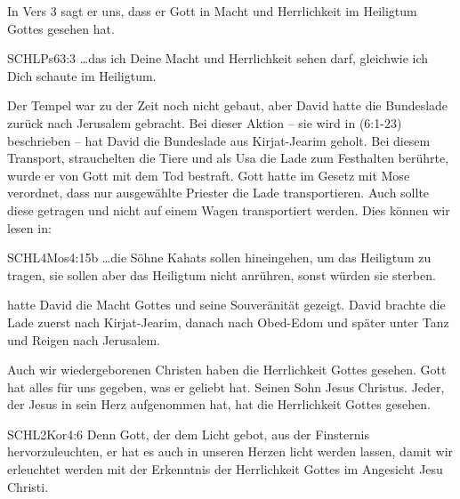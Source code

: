 \documentclass[fontsize=16pt]{mybib}
\begin{document}
    \begin{otsblock}
        In Vers 3 sagt er uns, dass er Gott in Macht und Herrlichkeit im Heiligtum Gottes gesehen hat.
        \begin{bibelbox}{SCHL}{Ps}{63:3}
            \dots das ich Deine Macht und Herrlichkeit sehen darf, gleichwie ich Dich schaute im Heiligtum.
        \end{bibelbox}
        Der Tempel war zu der Zeit noch nicht gebaut, aber David hatte die Bundeslade zurück nach Jerusalem gebracht. Bei dieser Aktion -- sie wird in  (6:1-23) beschrieben -- hat David die Bundeslade aus Kirjat-Jearim geholt. Bei diesem Transport, strauchelten die Tiere und als Usa die Lade zum Festhalten berührte, wurde er von Gott mit dem Tod bestraft. Gott hatte im Gesetz mit Mose verordnet, dass nur ausgewählte Priester die Lade transportieren. Auch sollte diese getragen und nicht auf einem Wagen transportiert werden. Dies können wir lesen in:
        \begin{bibelbox}{SCHL}{4Mos}{4:15b}
            \dots die Söhne Kahats sollen hineingehen, um das Heiligtum zu tragen, sie sollen aber das Heiligtum nicht anrühren, sonst würden sie sterben.
        \end{bibelbox}
         hatte David die Macht Gottes und seine Souveränität gezeigt. David brachte die Lade zuerst nach Kirjat-Jearim, danach nach Obed-Edom und später unter Tanz und Reigen nach Jerusalem.
    \end{otsblock}

    \begin{otsblock}
        Auch wir wiedergeborenen Christen haben die Herrlichkeit Gottes gesehen. Gott hat alles für uns gegeben, was er geliebt hat. Seinen Sohn Jesus Christus. Jeder, der Jesus in sein Herz aufgenommen hat, hat die Herrlichkeit Gottes gesehen.
        \begin{bibelbox}{SCHL}{2Kor}{4:6}
            Denn Gott, der dem Licht gebot, aus der Finsternis hervorzuleuchten, er hat es auch in unseren Herzen licht werden lassen, damit wir erleuchtet werden mit der Erkenntnis der Herrlichkeit Gottes im Angesicht Jesu Christi.
        \end{bibelbox}
    \end{otsblock}
\end{document}
